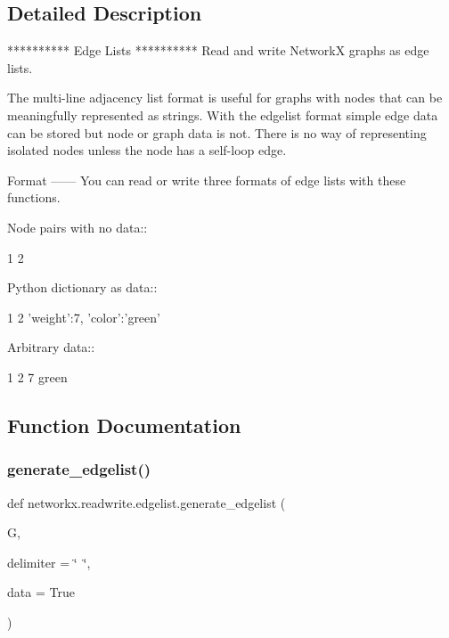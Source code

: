 \subsection{Detailed Description}
\begin{DoxyVerb}**********
Edge Lists
**********
Read and write NetworkX graphs as edge lists.

The multi-line adjacency list format is useful for graphs with nodes
that can be meaningfully represented as strings.  With the edgelist
format simple edge data can be stored but node or graph data is not.
There is no way of representing isolated nodes unless the node has a
self-loop edge.

Format
------
You can read or write three formats of edge lists with these functions.

Node pairs with no data::

 1 2

Python dictionary as data::

 1 2 {'weight':7, 'color':'green'}

Arbitrary data::

 1 2 7 green
\end{DoxyVerb}
 

\subsection{Function Documentation}
\mbox{\label{namespacenetworkx_1_1readwrite_1_1edgelist_a0439001b02316865d00e760b38c943b5}} 
\subsubsection{\texorpdfstring{generate\+\_\+edgelist()}{generate\_edgelist()}}
{\footnotesize\ttfamily def networkx.\+readwrite.\+edgelist.\+generate\+\_\+edgelist (\begin{DoxyParamCaption}\item[{}]{G,  }\item[{}]{delimiter = {\ttfamily \char`\"{}~\char`\"{}},  }\item[{}]{data = {\ttfamily True} }\end{DoxyParamCaption})}

